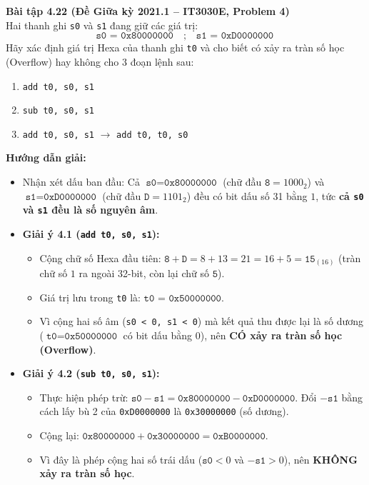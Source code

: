 \textbf{Bài tập 4.22 (Đề Giữa kỳ 2021.1 -- IT3030E, Problem 4)}\\
Hai thanh ghi \texttt{s0} và \texttt{s1} đang giữ các giá trị:
$$\texttt{s0 = 0x80000000} \quad ; \quad \texttt{s1 = 0xD0000000}$$
Hãy xác định giá trị Hexa của thanh ghi \texttt{t0} và cho biết có xảy ra tràn số học (Overflow) hay không cho 3 đoạn lệnh sau:
\begin{enumerate}[label=4.\arabic*.]
    \item \texttt{add t0, s0, s1}
    \item \texttt{sub t0, s0, s1}
    \item \texttt{add t0, s0, s1} $\rightarrow$ \texttt{add t0, t0, s0}
\end{enumerate}
\textbf{Hướng dẫn giải:}
\begin{itemize}
    \item Nhận xét dấu ban đầu: Cả $\texttt{s0} = \texttt{0x80000000}$ (chữ đầu $\texttt{8} = 1000_2$) và $\texttt{s1} = \texttt{0xD0000000}$ (chữ đầu $\texttt{D} = 1101_2$) đều có bit dấu số 31 bằng $1$, tức \textbf{cả \texttt{s0} và \texttt{s1} đều là số nguyên âm}.
    \item \textbf{Giải ý 4.1 (\texttt{add t0, s0, s1}):}
    \begin{itemize}
        \item Cộng chữ số Hexa đầu tiên: $\texttt{8} + \texttt{D} = 8 + 13 = 21 = 16 + 5 = \texttt{15}_{(16)}$ (tràn chữ số $1$ ra ngoài 32-bit, còn lại chữ số $\texttt{5}$).
        \item Giá trị lưu trong \texttt{t0} là: $\mathbf{\texttt{t0 = 0x50000000}}$.
        \item Vì cộng hai số âm (\texttt{s0 < 0, s1 < 0}) mà kết quả thu được lại là số dương ($\texttt{t0} = \texttt{0x50000000}$ có bit dấu bằng $0$), nên \textbf{CÓ xảy ra tràn số học (Overflow)}.
    \end{itemize}
    \item \textbf{Giải ý 4.2 (\texttt{sub t0, s0, s1}):}
    \begin{itemize}
        \item Thực hiện phép trừ: $\texttt{s0} - \texttt{s1} = \texttt{0x80000000} - \texttt{0xD0000000}$. Đổi $-\texttt{s1}$ bằng cách lấy bù 2 của \texttt{0xD0000000} là \texttt{0x30000000} (số dương).
        \item Cộng lại: $\texttt{0x80000000} + \texttt{0x30000000} = \mathbf{\texttt{0xB0000000}}$.
        \item Vì đây là phép cộng hai số trái dấu ($\texttt{s0} < 0$ và $-\texttt{s1} > 0$), nên \textbf{KHÔNG xảy ra tràn số học}.

\end{itemize}
\end{itemize}
